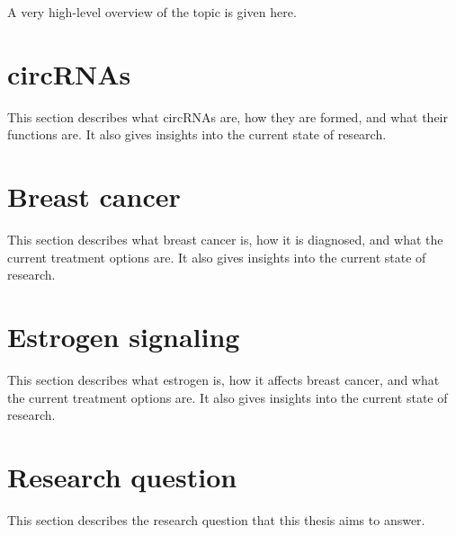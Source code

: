 A very high-level overview of the topic is given here.

\lipsum[1]

\section{circRNAs}
This section describes what circRNAs are, how they are formed, and what their functions are.
It also gives insights into the current state of research.

\lipsum[2]

\section{Breast cancer}
This section describes what breast cancer is, how it is diagnosed, and what the current treatment options are.
It also gives insights into the current state of research.

\lipsum[3]

\section{Estrogen signaling}
This section describes what estrogen is, how it affects breast cancer, and what the current treatment options are.
It also gives insights into the current state of research.

\lipsum[4]

\section{Research question}
This section describes the research question that this thesis aims to answer.

\lipsum[5]